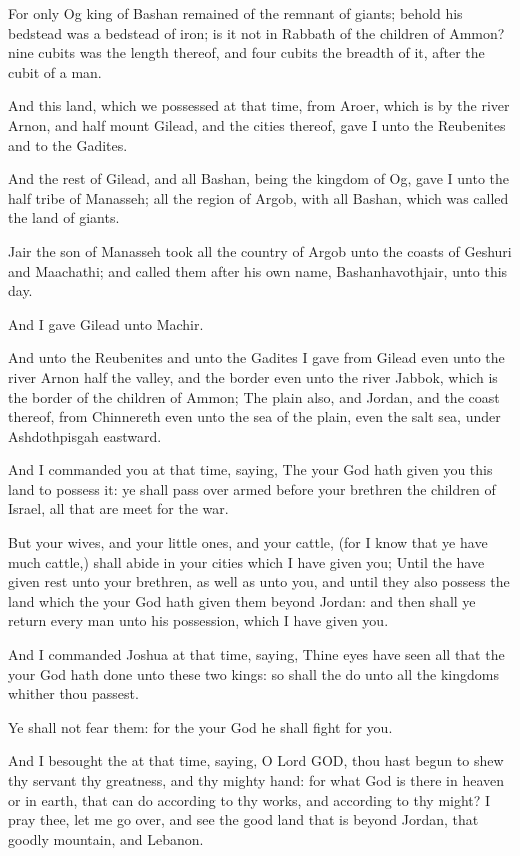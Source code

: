 \Verse For only Og king of Bashan remained of the remnant of giants; behold his bedstead was a bedstead of iron; is it not in Rabbath of the children of Ammon? nine cubits was the length thereof, and four cubits the breadth of it, after the cubit of a man.

\Verse And this land, which we possessed at that time, from Aroer, which is by the river Arnon, and half mount Gilead, and the cities thereof, gave I unto the Reubenites and to the Gadites.

\Verse And the rest of Gilead, and all Bashan, being the kingdom of Og, gave I unto the half tribe of Manasseh; all the region of Argob, with all Bashan, which was called the land of giants.

\Verse Jair the son of Manasseh took all the country of Argob unto the coasts of Geshuri and Maachathi; and called them after his own name, Bashanhavothjair, unto this day.

\Verse And I gave Gilead unto Machir.

\Verse And unto the Reubenites and unto the Gadites I gave from Gilead even unto the river Arnon half the valley, and the border even unto the river Jabbok, which is the border of the children of Ammon; \Verse The plain also, and Jordan, and the coast thereof, from Chinnereth even unto the sea of the plain, even the salt sea, under Ashdothpisgah eastward.

\Verse And I commanded you at that time, saying, The \LORD your God hath given you this land to possess it: ye shall pass over armed before your brethren the children of Israel, all that are meet for the war.

\Verse But your wives, and your little ones, and your cattle, (for I know that ye have much cattle,) shall abide in your cities which I have given you; \Verse Until the \LORD have given rest unto your brethren, as well as unto you, and until they also possess the land which the \LORD your God hath given them beyond Jordan: and then shall ye return every man unto his possession, which I have given you.

\Verse And I commanded Joshua at that time, saying, Thine eyes have seen all that the \LORD your God hath done unto these two kings: so shall the \LORD do unto all the kingdoms whither thou passest.

\Verse Ye shall not fear them: for the \LORD your God he shall fight for you.

\Verse And I besought the \LORD at that time, saying, \Verse O Lord GOD, thou hast begun to shew thy servant thy greatness, and thy mighty hand: for what God is there in heaven or in earth, that can do according to thy works, and according to thy might?  \Verse I pray thee, let me go over, and see the good land that is beyond Jordan, that goodly mountain, and Lebanon.

